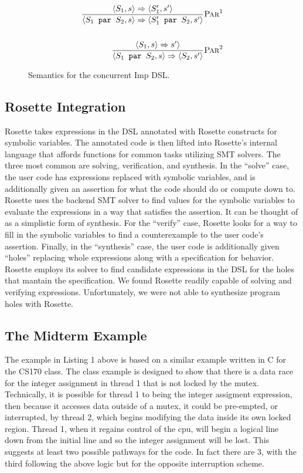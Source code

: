 \begin{figure}[!htbp]
\begin{align*}
\frac{\langle S_1 , s \rangle \Rightarrow \langle S_1' , s' \rangle}
	 {\langle S_1 \texttt{ par } S_2, s \rangle \Rightarrow \langle S_1' \texttt{ par } S_2, s' \rangle}
	 \textsc{Par}^1 
\\
\\
\frac{\langle S_1 , s \rangle \Rightarrow s' \rangle}
     {\langle S_1 \texttt{ par } S_2, s \rangle \Rightarrow \langle S_2, s' \rangle}  
	 \textsc{Par}^2
\end{align*}
\caption{Semantics for the concurrent Imp DSL.
}
\label{fig:par-rules}
\end{figure}

\subsection{Rosette Integration}
Rosette takes expressions in the DSL annotated with Rosette constructs for symbolic variables.  The annotated code is then lifted into Rosette's internal language that affords functions for common tasks utilizing SMT solvers.  The three most common are solving, verification, and synthesis.  In the ``solve'' case, the user code has expressions replaced with symbolic variables, and is additionally given an assertion for what the code should do or compute down to. Rosette uses the backend SMT solver to find values for the symbolic variables to evaluate the expressions in a way that satisfies the assertion.  It can be thought of as a simplistic form of synthesis.  For the ``verify'' case, Rosette looks for a way to fill in the symbolic variables to find a counterexample to the user code's assertion. Finally, in the ``synthesis'' case, the user code is additionally given ``holes'' replacing whole expressions along with a specification for behavior.  Rosette employs its solver to find candidate expressions in the DSL for the holes that mantain the specification.  We found Rosette readily capable of solving and verifying expressions.  Unfortunately, we were not able to synthesize program holes with Rosette.

\subsection{The Midterm Example}
The example in Listing 1 above is based on a similar example written in C for the CS170 class.  The class example is designed to show that there is a data race for the integer assignment in thread 1 that is not locked by the mutex.  Technically, it is possible for thread 1 to being the integer assigment expression, then because it accesses data outside of a mutex, it could be pre-empted, or interrupted, by thread 2, which begins modifying the data inside its own locked region.  Thread 1, when it regains control of the cpu, will begin a logical line down from the initial line and so the integer assignment will be lost.  This suggests at least two possible pathways for the code.  In fact there are 3, with the third following the above logic but for the opposite interruption scheme.

